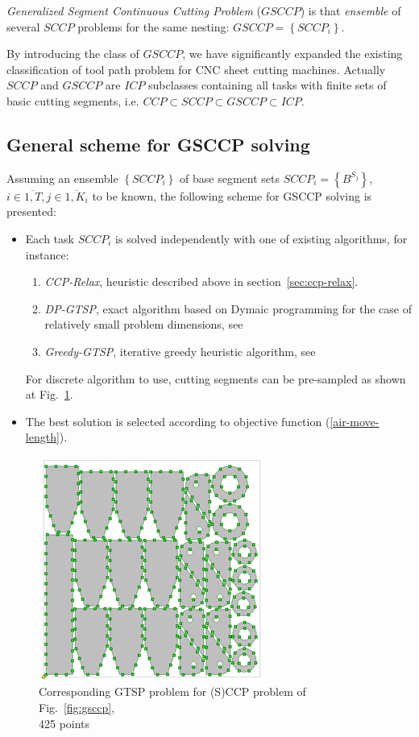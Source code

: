 \documentclass[]{llncs}
\begin{document}
{\it Generalized Segment Continuous Cutting Problem}
($GSCCP$)
is that {\it ensemble} of several $SCCP$
problems for the same nesting:
$GSCCP = \left\{ SCCP_i \right\}$.

By introducing the class of $GSCCP$,
we have significantly expanded the existing
classification of tool path problem for CNC sheet cutting machines.
Actually $SCCP$ and $GSCCP$ are $ICP$
subclasses containing all tasks with finite sets of basic cutting segments,
i.e.
$ CCP \subset SCCP \subset GSCCP \subset ICP$.

\subsection*{General scheme for GSCCP solving}

Assuming an ensemble
$\left\{ SCCP_i \right\}$
of base segment sets
$SCCP_i = \left\{B^{S_j}\right\}$,
$
i \in \overline{1, T},
j \in \overline{1, K_i}
$
to be known,
the following scheme for GSCCP solving
is presented:

\begin{itemize}
  \item
  Each task $SCCP_i$ is solved independently
  with one of existing algorithms, for instance:
  \begin{enumerate}
    \item
    {\it CCP-Relax}, heuristic described above in section~\ref{sec:ccp-relax}.
    \item
    {\it DP-GTSP}, exact algorithm based on Dymaic programming
    for the case of relatively small problem dimensions,
    see \cite{bi15}
    \item
    {\it Greedy-GTSP}, iterative greedy heuristic algorithm,
    see \cite{bib:greedy}
  \end{enumerate}
  For discrete algorithm to use,
  cutting segments can be pre-sampled as shown
  at Fig.~\ref{fig:gtsp425}.

  \item
  The best solution is selected
  according to objective function (\ref{air-move-length}).
\end{itemize}

\begin{figure}
  \centering
  \includegraphics[width=0.5\columnwidth]{gtsp425.png}
  \caption{
    Corresponding GTSP problem for (S)CCP problem of Fig.~\ref{fig:gsccp},\\
    425 points
  }
  \label{fig:gtsp425}
\end{figure}
\end{document}
